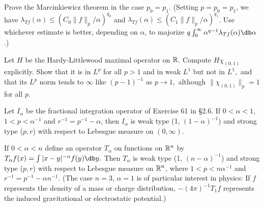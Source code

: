 \documentclass[12pt, a4paper]{article}
\begin{document}
\begin{problem}\label{prob:6-42}
Prove the Marcinkiewicz theorem in the case $p_{0}=p_{1}$. (Setting $p=p_{0}=p_{1}$, we have $\lambda_{Tf}(\alpha)\le(C_{0}\|f\|_{p}/\alpha)^{q_{0}}$ and $\lambda_{Tf}(\alpha)\le(C_{1}\|f\|_{p}/\alpha)^{q_{1}}$. Use whichever estimate is better, depending on $\alpha$, to majorize $q\int_{0}^{\infty}\alpha^{q-1}\lambda_{Tf}(\alpha)\db\alpha$.)
\end{problem}

\begin{problem}\label{prob:6-43}
Let $H$ be the Hardy-Littlewood maximal operator on $\mathbb{R}$. Compute $H\chi_{(0,1)}$ explicitly. Show that it is in $L^{p}$ for all $p>1$ and in weak $L^{1}$ but not in $L^{1},$ and that its $L^{p}$ norm tends to $\infty$ like $(p-1)^{-1}$ as $p\rightarrow1,$ although $\|\chi_{(0,1)}\|_{p}=1$ for all $p$.
\end{problem}

\begin{problem}\label{prob:6-44}
Let $I_{\alpha}$ be the fractional integration operator of Exercise 61 in \S 2.6. If $0<\alpha<1$, $1<p<\alpha^{-1}$ and $r^{-1}=p^{-1}-\alpha$, then $I_{\alpha}$ is weak type (1, $(1-\alpha)^{-1}$) and strong type ($p,r$) with respect to Lebesgue measure on $(0,\infty)$.
\end{problem}

\begin{problem}\label{prob:6-45}
If $0<\alpha<n$ define an operator $T_{\alpha}$ on functions on $\mathbb{R}^{n}$ by $T_{\alpha}f(x)=\int|x-y|^{-\alpha}f(y)\db y.$ Then $T_{\alpha}$ is weak type (1, $(n-\alpha)^{-1}$) and strong type ($p,r$) with respect to Lebesgue measure on $\mathbb{R}^{n}$, where $1<p<n\alpha^{-1}$ and $r^{-1}=p^{-1}-\alpha n^{-1}$. (The case $n=3$, $\alpha=1$ is of particular interest in physics: If $f$ represents the density of a mass or charge distribution, $-(4\pi)^{-1}T_{1}f$ represents the induced gravitational or electrostatic potential.)
\end{problem}
\end{document}
